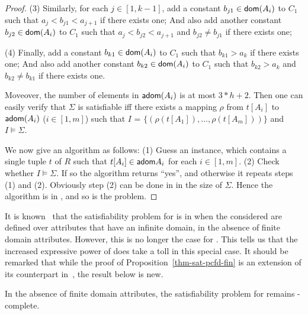 \begin{proof}
\item[(3)] Similarly, for each $j\in[1, k - 1]$, add a constant $b_{j1}\in\protect\mathsf{dom}(A_i)$ to $C_1$
such that $a_j < b_{j1} < a_{j+1}$ if there exists
one; And also add another constant $b_{j2}\in\protect\mathsf{dom}(A_i)$ to $C_1$ such
that $a_j < b_{j2} < a_{j+1}$ and $b_{j2}\ne b_{j1}$ if
there exists one;

\item[(4)] Finally, add a constant $b_{k1}\in\protect\mathsf{dom}(A_i)$ to $C_1$ such that $b_{k1} > a_k$ if there exists one;
And also add another constant $b_{k2}\in\protect\mathsf{dom}(A_i)$ to $C_1$ such that
$b_{k2} > a_k$ and $b_{k2} \ne b_{k1}$ if there exists one.
\ei

\noindent Moveover, the number of elements in ${\mathsf{adom}}(A_i)$ is at
most $3*h + 2$. Then one can easily verify that $\Sigma$ is
satisfiable iff there exists a mapping $\rho$ from $t[A_i]$ to
${\mathsf{adom}}(A_i)$ ($i\in [1, m]$) such that $I$ = $\{(\rho(t[A_1]),
\ldots, \rho(t[A_m]))\}$ and $I \models \Sigma$.


We now give an \NP algorithm as follows: (1) Guess an
instance, which contains a single tuple $t$ of $R$ such that
$t[A_i]\in{\ensuremath {\mathsf{adom}}}{A_i}$ for each $i \in [1, m]$. (2) Check whether $I
\models \Sigma$. If so the algorithm returns ``yes'', and otherwise
it repeats steps (1) and (2). Obviously step (2) can be done in
\PTIME in the size of $\Sigma$. Hence the algorithm is in \NP, and
so is the problem.
\end{proof}


It is known~\cite{CFDs} that the satisfiability problem for \CFDs is
in \PTIME when the \CFDs considered are defined over attributes that
have an infinite domain, \ie in the absence of finite domain
attributes. However, this is no longer the case for \pCFDs. This
tells us that the increased expressive power of \pCFDs does take a
toll in this special case. It should be remarked that while the
proof of Proposition~\ref{thm-sat-pcfd-fin} is an extension of its
counterpart in~\cite{CFDs}, the result below is new.


\begin{theorem}
\label{thm-sat-pcfd-infin} In the absence of finite domain
attributes, the satisfiability problem for \pCFDs remains
\NP-complete.
\end{theorem}

